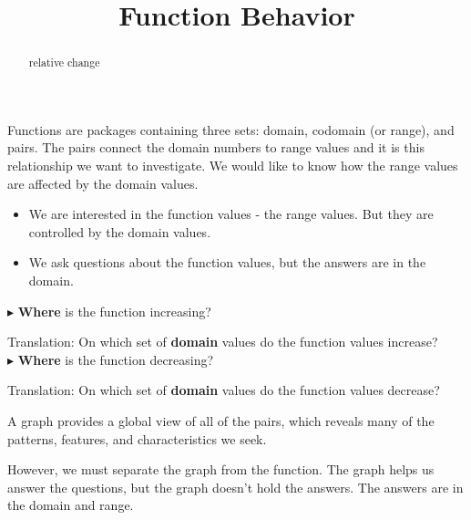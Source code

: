 \documentclass{ximera}
\title{Function Behavior}
\begin{document}
\begin{abstract}
relative change
\end{abstract}
\maketitle





Functions are packages containing three sets: domain, codomain (or range), and pairs.  The pairs connect the domain numbers to range values and it is this relationship we want to investigate.   We would like to know how the range values are affected by the domain values.  \\



\begin{itemize}
\item We are interested in the function values - the range values.  But they are controlled by the domain values. \\
\item We ask questions about the function values, but the answers are in the domain.
\end{itemize}




\begin{idea}

$\blacktriangleright$ \textbf{\textcolor{purple!85!blue}{Where}} is the function increasing? 

Translation: On which set of \textbf{\textcolor{purple!85!blue}{domain}} values do the function values increase? \\


$\blacktriangleright$ \textbf{\textcolor{purple!85!blue}{Where}} is the function decreasing? 

Translation: On which set of \textbf{\textcolor{purple!85!blue}{domain}} values do the function values decrease? \\


\end{idea}








A graph provides a global view of all of the pairs, which reveals many of the patterns, features, and characteristics we seek.   

However, we must separate the graph from the function.  The graph helps us answer the questions, but the graph doesn't hold the answers.  The answers are in the domain and range. 
\end{document}
